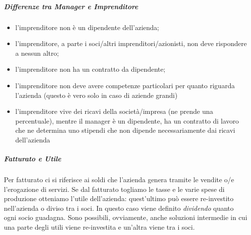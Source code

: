 \subparagraph*{Differenze tra Manager e Imprenditore}
\begin{itemize}
  \item l'imprenditore non è un dipendente dell'azienda;
  \item l'imprenditore, a parte i soci/altri imprenditori/azionisti, non deve
rispondere a nessun altro;
  \item l'imprenditore non ha un contratto da dipendente;
  \item l'imprenditore non deve avere competenze particolari per quanto riguarda
l'azienda (questo è vero solo in caso di aziende grandi)
  \item l'imprenditore vive dei ricavi della società/impresa (ne prende una
percentuale), mentre il manager è un dipendente, ha un contratto di lavoro che
ne determina uno stipendi che non dipende necessariamente dai ricavi
dell'azienda\\[0.5cm] 
\end{itemize}

\subparagraph*{Fatturato e Utile} Per fatturato ci si riferisce ai soldi che
l'azienda genera tramite le vendite o/e l'erogazione di servizi. Se dal
fatturato togliamo le tasse e le varie spese di produzione otteniamo l'utile
dell'azienda: quest'ultimo può essere re-investito nell'azienda o diviso tra
i soci. In questo caso viene definito \textit{dividendo} quanto ogni socio
guadagna. Sono possibili, ovviamente, anche soluzioni intermedie in cui una
parte degli utili viene re-investita e un'altra viene tra i soci.
